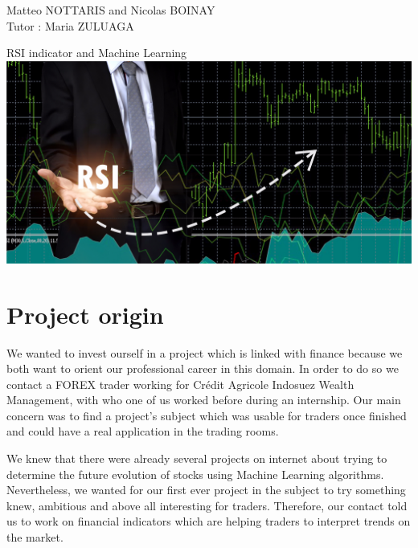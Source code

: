 \documentclass[]{article}
\begin{document}
\begin{titlepage}

\begin{flushleft}
Matteo NOTTARIS and Nicolas BOINAY \\
\bigskip
Tutor : Maria ZULUAGA
\end{flushleft}

\vspace*{\fill}  
\begin{center}  
     {\huge RSI indicator and Machine Learning}\\[30mm]
     \includegraphics[scale=0.35]{image/rsi_bourse.png}
	 \centering
\end{center}
\vspace*{\fill} 

\end{titlepage}

\doublespacing

\renewcommand*\contentsname{Summary}

\tableofcontents
\clearpage
\singlespacing

\section{Project origin}

\vskip 0.5cm
We wanted to invest ourself in a project which is linked with finance because we both want to orient our professional career in this domain.
In order to do so we contact a FOREX trader working for Crédit Agricole Indosuez Wealth Management, with who one of us worked before during an internship. Our main concern was to find a project's subject which was usable for traders once finished and could have a real application in the trading rooms.

\vskip 0.5cm
We knew that there were already several projects on internet about trying to determine the future evolution of stocks using Machine Learning algorithms. Nevertheless, we wanted for our first ever project in the subject to try something knew, ambitious and above all interesting for traders. Therefore, our contact told us to work on financial indicators which are helping traders to interpret trends on the market.
\end{document}
